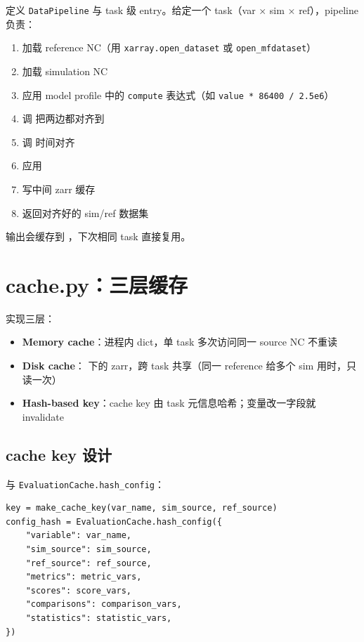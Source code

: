  定义 \texttt{DataPipeline} 与 task 级 entry。给定一个 task（var × sim × ref），pipeline 负责：

\begin{enumerate}
  \item 加载 reference NC（用 \texttt{xarray.open\_dataset} 或 \texttt{open\_mfdataset}）
  \item 加载 simulation NC
  \item 应用 model profile 中的 \texttt{compute} 表达式（如 \texttt{value * 86400 / 2.5e6}）
  \item 调  把两边都对齐到 
  \item 调  时间对齐
  \item 应用 
  \item 写中间 zarr 缓存
  \item 返回对齐好的 sim/ref 数据集
\end{enumerate}

输出会缓存到 ，下次相同 task 直接复用。

\section{cache.py：三层缓存}

 实现三层：

\begin{itemize}
  \item \textbf{Memory cache}：进程内 dict，单 task 多次访问同一 source NC 不重读
  \item \textbf{Disk cache}： 下的 zarr，跨 task 共享（同一 reference 给多个 sim 用时，只读一次）
  \item \textbf{Hash-based key}：cache key 由 task 元信息哈希；变量改一字段就 invalidate
\end{itemize}

\subsection{cache key 设计}

 与 \texttt{EvaluationCache.hash\_config}：

\begin{verbatim}
key = make_cache_key(var_name, sim_source, ref_source)
config_hash = EvaluationCache.hash_config({
    "variable": var_name,
    "sim_source": sim_source,
    "ref_source": ref_source,
    "metrics": metric_vars,
    "scores": score_vars,
    "comparisons": comparison_vars,
    "statistics": statistic_vars,
})
\end{verbatim}


